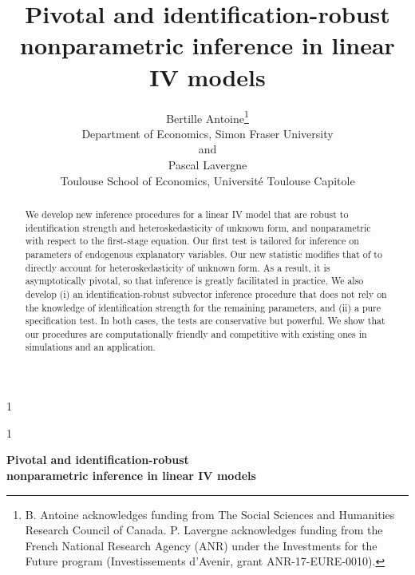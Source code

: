 \documentclass[12pt]{article}
\newcommand{\anon}{1}
\newcommand{\1}{\mathbf{1}}
\begin{document}
\def\spacingset#1{\renewcommand{\baselinestretch}%
{#1}\small\normalsize} \spacingset{1}




\anon
{
  \title{\bf Pivotal and identification-robust \\nonparametric
  inference in linear IV models}
  \author{Bertille Antoine\thanks{
    B. Antoine acknowledges funding from The Social Sciences and Humanities Research Council of Canada. P. Lavergne acknowledges funding from the French National Research Agency (ANR) under the Investments for the Future program (Investissements d'Avenir, grant ANR-17-EURE-0010).}\hspace{.2cm}\\
    Department of Economics, Simon Fraser University\\
    and \\
    Pascal Lavergne\\
    Toulouse School of Economics, Universit\'e Toulouse  Capitole}
  \maketitle
} \fi

\anon
{
  \bigskip
  \bigskip
  \bigskip
  \begin{center}
    {\LARGE \bf Pivotal and identification-robust \\ \vspace{.2cm} nonparametric
  inference in linear IV models}
\end{center}
  \medskip
} \fi

\bigskip
\begin{abstract}
We develop new inference procedures for a linear IV model that are
robust to identification strength and heteroskedasticity of unknown
form, and nonparametric with respect to the first-stage
equation.  Our first test is tailored for inference on parameters of
endogenous explanatory variables. Our new statistic modifies that
of \cite{antoine_identification-robust_2023} to directly account for
heteroskedasticity of unknown form.
As a result, it is asymptotically pivotal, so that inference is greatly
facilitated in practice.  We also develop (i) an identification-robust
subvector inference procedure that does not rely on the knowledge of
identification strength for the remaining parameters, and (ii) a pure
specification test.  In both cases, the tests are conservative but
powerful.
We show that our procedures are computationally friendly and
competitive with existing ones in simulations and an
application.
\end{abstract}
\end{document}
